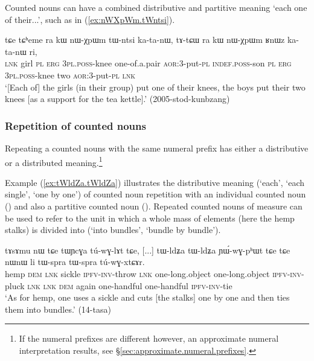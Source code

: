 Counted nouns can have a combined distributive and partitive meaning `each one of their...', such as  in (\ref{ex:nWXpWm.tWntsi}).

\begin{exe}
	\ex \label{ex:nWXpWm.tWntsi}
	\gll tɕe tɕʰeme ra kɯ nɯ-χpɯm tɯ-ntsi ka-ta-nɯ, tɤ-tɕɯ ra kɯ nɯ-χpɯm ʁnɯz ka-ta-nɯ ri,  \\
	\textsc{lnk} girl \textsc{pl} \textsc{erg} \textsc{3pl}.\textsc{poss}-knee one-of.a.pair \textsc{aor}:3\flobv{}-put-\textsc{pl} \textsc{indef}.\textsc{poss}-son \textsc{pl} \textsc{erg}  \textsc{3pl}.\textsc{poss}-knee two \textsc{aor}:3\flobv{}-put-\textsc{pl} \textsc{lnk} \\
	\glt `[Each of] the girls (in their group) put one of their knees, the boys put their two knees [as a support for the tea kettle].' (2005-stod-kunbzang)
\end{exe}


\subsubsection{Repetition of counted nouns} \label{sec:CN.repetition}
Repeating a counted nouns with the same numeral prefix has either a distributive or a distributed meaning.\footnote{If the numeral prefixes are different however, an approximate numeral interpretation results, see §\ref{sec:approximate.numeral.prefixes}.}

Example (\ref{ex:tWldZa.tWldZa}) illustrates the distributive meaning (`each', `each single', `one by one') of counted noun repetition with an individual counted noun () and also a partitive counted noun  (). Repeated counted nouns of measure can be used to refer to the unit in which a whole mass of elements (here the hemp stalks) is divided into (`into bundles', `bundle by bundle').

\begin{exe}
	\ex \label{ex:tWldZa.tWldZa}
	\gll  tɤsɤmu nɯ tɕe tɯɲcɣa tú-wɣ-lɤt tɕe, [...] tɯ-ldʑa tɯ-ldʑa ɲɯ́-wɣ-pʰɯt tɕe tɕe nɯnɯ li tɯ-spra tɯ-spra tú-wɣ-xtɕɤr. \\
	hemp \textsc{dem} \textsc{lnk} sickle \textsc{ipfv}-\textsc{inv}-throw \textsc{lnk} { } one-long.object one-long.object \textsc{ipfv}-\textsc{inv}-pluck \textsc{lnk} \textsc{lnk} \textsc{dem} again one-handful one-handful \textsc{ipfv}-\textsc{inv}-tie  \\
	\glt `As for hemp, one uses a sickle and cuts [the stalks] one by one and then ties them into bundles.'  (14-tasa)
\end{exe}

